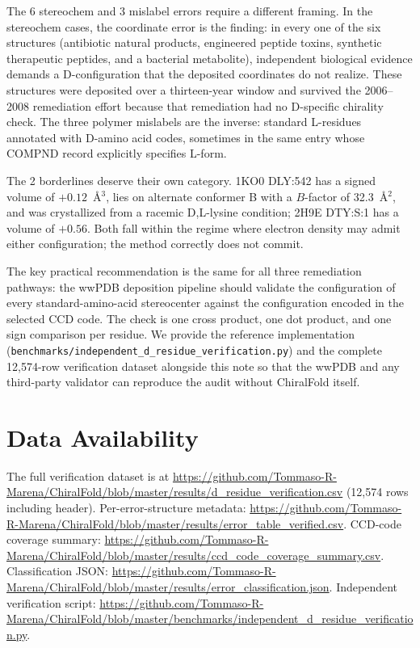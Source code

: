 \documentclass[11pt]{article}
\begin{document}
The 6 stereochem and 3 mislabel errors require a different framing. In the stereochem cases, the coordinate error is the finding: in every one of the six structures (antibiotic natural products, engineered peptide toxins, synthetic therapeutic peptides, and a bacterial metabolite), independent biological evidence demands a D-configuration that the deposited coordinates do not realize. These structures were deposited over a thirteen-year window and survived the 2006--2008 remediation effort because that remediation had no D-specific chirality check. The three polymer mislabels are the inverse: standard L-residues annotated with D-amino acid codes, sometimes in the same entry whose COMPND record explicitly specifies L-form.

The 2 borderlines deserve their own category. 1KO0 DLY:542 has a signed volume of $+0.12$~\AA$^3$, lies on alternate conformer B with a $B$-factor of 32.3~\AA$^2$, and was crystallized from a racemic D,L-lysine condition; 2H9E DTY:S:1 has a volume of $+0.56$. Both fall within the regime where electron density may admit either configuration; the method correctly does not commit.

The key practical recommendation is the same for all three remediation pathways: the wwPDB deposition pipeline should validate the configuration of every standard-amino-acid stereocenter against the configuration encoded in the selected CCD code. The check is one cross product, one dot product, and one sign comparison per residue. We provide the reference implementation (\texttt{benchmarks/independent\_d\_residue\_verification.py}) and the complete 12{,}574-row verification dataset alongside this note so that the wwPDB and any third-party validator can reproduce the audit without ChiralFold itself.

\section*{Data Availability}

The full verification dataset is at \url{https://github.com/Tommaso-R-Marena/ChiralFold/blob/master/results/d_residue_verification.csv} (12{,}574 rows including header). Per-error-structure metadata: \url{https://github.com/Tommaso-R-Marena/ChiralFold/blob/master/results/error_table_verified.csv}. CCD-code coverage summary: \url{https://github.com/Tommaso-R-Marena/ChiralFold/blob/master/results/ccd_code_coverage_summary.csv}. Classification JSON: \url{https://github.com/Tommaso-R-Marena/ChiralFold/blob/master/results/error_classification.json}. Independent verification script: \url{https://github.com/Tommaso-R-Marena/ChiralFold/blob/master/benchmarks/independent_d_residue_verification.py}.
\end{document}
